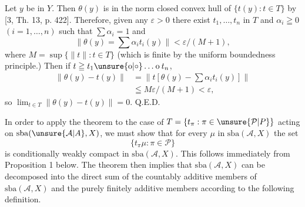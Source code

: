 
Let $y$ be in $Y$. Then $\theta(y)$ is in the norm closed convex hull of $\{t(y):t\in T\}$ by [3, Th. 13, p. 422]. Therefore, given any $\varepsilon>0$ there exist $t_1,\ldots,t_n$ in $T$ and $\alpha_i\geqq 0$ $(i=1,\ldots,n)$ such that $\sum\alpha_i=1$ and
\[
\lVert\theta(y)=\sum\alpha_i t_i(y)\rVert<\varepsilon/(M+1),
\]
where $M=\sup\{\lVert t\rVert:t\in T\}$ (which is finite by the uniform boundedness principle.) Then if $t\geqq t_1\unsure{\mathbin{\mathrm{o}}|\circ}\ldots\mathbin{\mathrm{o}}t_n$,
\[
\begin{aligned}
\lVert\theta(y)-t(y)\rVert&=\lVert t[\theta(y)-\sum\alpha_i t_i(y)]\rVert\\
&\leqq M\varepsilon/(M+1)<\varepsilon,
\end{aligned}
\]
so $\displaystyle\lim_{t\in T}\lVert\theta(y)-t(y)\rVert=0$. \hfill Q.E.D.

In order to apply the theorem to the case of $T=\{t_\pi:\pi\in\unsure{\mathcal{P}|P}\}$ acting on $\mathrm{sba}(\unsure{\mathcal{A}|A},X)$, we must show that for every $\mu$ in $\mathrm{sba}(\mathcal{A},X)$ the set
\[
\{t_\pi\mu:\pi\in\mathcal{P}\}
\]
is conditionally weakly compact in $\mathrm{sba}(\mathcal{A},X)$. This follows immediately from Proposition 1 below. The theorem then implies that $\mathrm{sba}(\mathcal{A},X)$ can be decomposed into the direct sum of the countably additive members of $\mathrm{sba}(\mathcal{A},X)$ and the purely finitely additive members according to the following definition.

